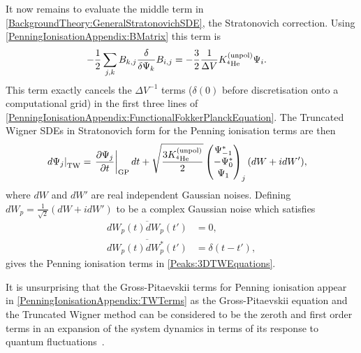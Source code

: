It now remains to evaluate the middle term in \eqref{BackgroundTheory:GeneralStratonovichSDE}, the Stratonovich correction. Using \eqref{PenningIonisationAppendix:BMatrix} this term is
\begin{align}
    - \frac{1}{2} \sum_{j, k} B_{k, j} \frac{\delta }{\delta \Psi_k}B_{i,j} &= - \frac{3}{2} \frac{1}{\Delta V} K^\text{(unpol)}_{^4\text{He}} \Psi_i.
\end{align}
This term exactly cancels the $\Delta V^{-1}$ terms ($\delta(0)$ before discretisation onto a computational grid) in the first three lines of \eqref{PenningIonisationAppendix:FunctionalFokkerPlanckEquation}. The Truncated Wigner SDEs in Stratonovich form for the Penning ionisation terms are then
\begin{align}
    \left. d \Psi_j\right|_\text{TW} &= \left. \frac{\partial \Psi_j}{\partial t}\right|_\text{GP} dt + \sqrt{\frac{3 \Kunpol}{2}} 
    \begin{pmatrix}
        \Psi_{-1}^*\\
        -\Psi_{0}^*\\
        \Psi_{1}
    \end{pmatrix}_j (d W + i dW'),
    \label{PenningIonisationAppendix:TWTerms}
\end{align}
where $dW$ and $dW'$ are real independent Gaussian noises. Defining $ dW_p = \frac{1}{\sqrt{2}}\left(dW + i dW' \right)$ to be a complex Gaussian noise which satisfies
\begin{align}
    \overline{dW_p(t) dW_p(t')} &= 0, \\
    \overline{dW_p(t) dW_p^*(t')} &= \delta(t-t'),
\end{align}
gives the Penning ionisation terms in \eqref{Peaks:3DTWEquations}.

It is unsurprising that the Gross-Pitaevskii terms for Penning ionisation appear in \eqref{PenningIonisationAppendix:TWTerms} as the Gross-Pitaevskii equation and the Truncated Wigner method can be considered to be the zeroth and first order terms in an expansion of the system dynamics in terms of its response to quantum fluctuations~\citep{Polkovnikov:2003}.